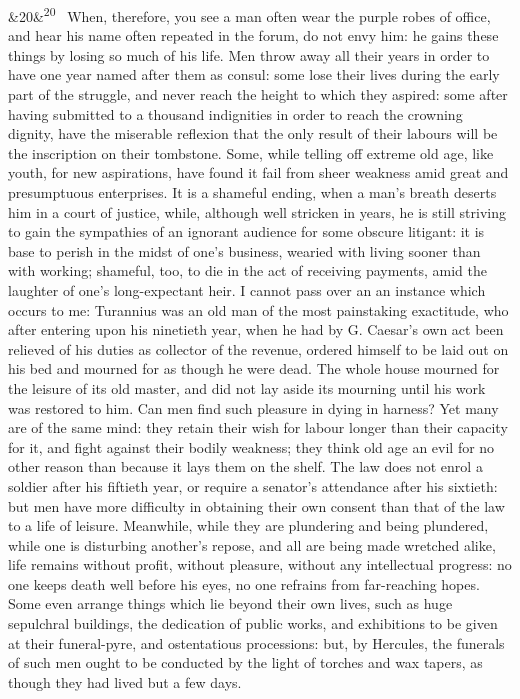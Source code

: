 \documentclass[12pt]{article}
\newcommand{\para}[1][]{\par\noindent\ifx&#1&\else\textsuperscript{\footnotesize #1}~\fi}
\begin{document}
\para[20] When, therefore, you see a man often wear the purple robes of office, and hear his name often repeated in the forum, do not envy him: he gains these things by losing so much of his life. Men throw away all their years in order to have one year named after them as consul: some lose their lives during the early part of the struggle, and never reach the height to which they aspired: some after having submitted to a thousand indignities in order to reach the crowning dignity, have the miserable reflexion that the only result of their labours will be the inscription on their tombstone. Some, while telling off extreme old age, like youth, for new aspirations, have found it fail from sheer weakness amid great and presumptuous enterprises. It is a shameful ending, when a man’s breath deserts him in a court of justice, while, although well stricken in years, he is still striving to gain the sympathies of an ignorant audience for some obscure litigant: it is base to perish in the midst of one’s business, wearied with living sooner than with working; shameful, too, to die in the act of receiving payments, amid the laughter of one’s long-expectant heir. I cannot pass over an an instance which occurs to me: Turannius was an old man of the most painstaking exactitude, who after entering upon his ninetieth year, when he had by G. Caesar’s own act been relieved of his duties as collector of the revenue, ordered himself to be laid out on his bed and mourned for as though he were dead. The whole house mourned for the leisure of its old master, and did not lay aside its mourning until his work was restored to him. Can men find such pleasure in dying in harness? Yet many are of the same mind: they retain their wish for labour longer than their capacity for it, and fight against their bodily weakness; they think old age an evil for no other reason than because it lays them on the shelf. The law does not enrol a soldier after his fiftieth year, or require a senator’s attendance after his sixtieth: but men have more difficulty in obtaining their own consent than that of the law to a life of leisure. Meanwhile, while they are plundering and being plundered, while one is disturbing another’s repose, and all are being made wretched alike, life remains without profit, without pleasure, without any intellectual progress: no one keeps death well before his eyes, no one refrains from far-reaching hopes. Some even arrange things which lie beyond their own lives, such as huge sepulchral buildings, the dedication of public works, and exhibitions to be given at their funeral-pyre, and ostentatious processions: but, by Hercules, the funerals of such men ought to be conducted by the light of torches and wax tapers, as though they had lived but a few days.
\end{document}
